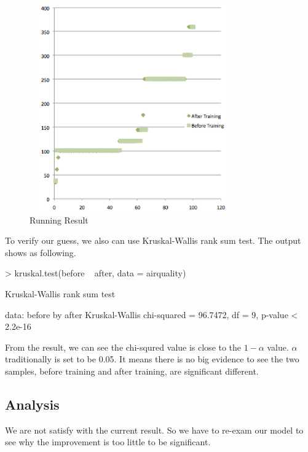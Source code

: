 \documentclass{sig-alternate}
\begin{document}
\begin{figure}[!h]
\centering
\includegraphics[height=3.5in,width=3.5in]{improved}
\caption{Running Result }
\label{fig:improvedpic}
\end{figure}

To verify our guess, we also can use Kruskal-Wallis rank sum test.  The output shows as following. \\
\begin{table}
\begin{Schunk}
\begin{Sinput}
> kruskal.test(before ~ after, data = airquality)
\end{Sinput}
\begin{Soutput}
	Kruskal-Wallis rank sum test

data:  before by after 
Kruskal-Wallis chi-squared = 96.7472,
 df = 9, p-value < 2.2e-16
\end{Soutput}
\end{Schunk}
\end{table}

From the result, we can see the chi-squred value is close to the $1- \alpha$ value. $\alpha$ traditionally is set to be 0.05.  It means there is no big evidence to see the two samples, before training and after training, are significant different. \\

\subsection{Analysis}
We are not satisfy with the current result. So we have to re-exam our model to see why the improvement is too little to be significant.  \\
\end{document}
